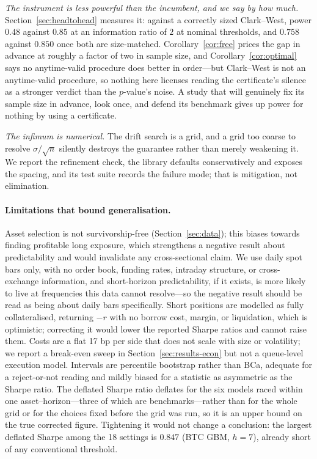 \documentclass{article}
\theoremstyle{plain}
\theoremstyle{definition}
\begin{document}
\emph{The instrument is less powerful than the incumbent, and we say by how much.}
Section~\ref{sec:headtohead} measures it: against a correctly sized Clark--West, power $0.48$
against $0.85$ at an information ratio of $2$ at nominal thresholds, and $0.758$ against
$0.850$ once both are size-matched. Corollary~\ref{cor:free} prices the gap in advance at
roughly a factor of two in sample size, and Corollary~\ref{cor:optimal} says no anytime-valid
procedure does better in order---but Clark--West is not an anytime-valid procedure, so nothing
here licenses reading the certificate's silence as a stronger verdict than the $p$-value's
noise. A study that will genuinely fix its sample size in advance, look once, and defend its
benchmark gives up power for nothing by using a certificate.

\emph{The infimum is numerical.} The drift search is a grid, and a grid too coarse to resolve
$\sigma/\sqrt{n}$ silently destroys the guarantee rather than merely weakening it. We report
the refinement check, the library defaults conservatively and exposes the spacing, and its
test suite records the failure mode; that is mitigation, not elimination.

\paragraph{Limitations that bound generalisation.}
Asset selection is not survivorship-free (Section~\ref{sec:data}); this biases
towards finding profitable long exposure, which strengthens a negative result about
predictability and would invalidate any cross-sectional claim. We use daily spot
bars only, with no order book, funding rates, intraday structure, or cross-exchange
information, and short-horizon predictability, if it exists, is more likely to live
at frequencies this data cannot resolve---so the negative result should be read as
being about daily bars specifically. Short positions are modelled as fully
collateralised, returning $-r$ with no borrow cost, margin, or liquidation, which is
optimistic; correcting it would lower the reported Sharpe ratios and cannot raise
them. Costs are a flat 17 bp per side that does not scale with size or volatility; we report a
break-even sweep in Section~\ref{sec:results-econ} but not a queue-level execution model. Intervals are percentile bootstrap
rather than BCa, adequate for a reject-or-not reading and mildly biased for a
statistic as asymmetric as the Sharpe ratio. The deflated Sharpe ratio deflates for
the six models raced within one asset--horizon---three of which are
benchmarks---rather than for the whole grid or for the choices fixed before the grid
was run, so it is an upper bound on the true corrected figure. Tightening it would
not change a conclusion: the largest deflated Sharpe among the 18 settings is
$0.847$ (BTC GBM, $h=7$), already short of any conventional threshold.
\end{document}
